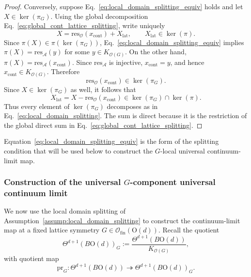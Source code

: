 \documentclass[aps,prx,reprint,superscriptaddress,twocolumn,amsmath,amssymb,amsfonts, nofootinbib]{revtex4-2}
\newcommand{\ofin}{\mathcal{O}_{\text{fin}}}
\newcommand{\res}{\text{res}}
\theoremstyle{apsstyle}
\begin{document}
\begin{proof}
Conversely, suppose Eq.~\ref{eq:local_domain_splitting_equiv} holds and let
$X\in\ker(\pi_G)$. Using the global decomposition
Eq.~\ref{eq:global_cont_lattice_splitting}, write uniquely
\begin{equation*}
    X=\res_{\mathcal O}(x_{\mathrm{cont}})+X_{\mathrm{lat}},
    \qquad
    X_{\mathrm{lat}}\in\ker(\pi).
\end{equation*}
Since $\pi(X)\in\pi(\ker(\pi_G))$, Eq.~\ref{eq:local_domain_splitting_equiv} implies $\pi(X)=\res_{\mathcal A}(y)$ for some $y\in K_{\mathcal O(G)}$. On the other hand, $\pi(X)=\res_{\mathcal A}(x_{\mathrm{cont}})$. Since $\res_{\mathcal A}$ is injective, $x_{\mathrm{cont}}=y$, and hence
$x_{\mathrm{cont}}\in K_{\mathcal O(G)}$. Therefore
\begin{equation*}
    \res_{\mathcal O}(x_{\mathrm{cont}})
    \in\ker(\pi_G).
\end{equation*}
Since $X\in\ker(\pi_G)$ as well, it follows that
\begin{equation*}
    X_{\mathrm{lat}}
    =
    X-\res_{\mathcal O}(x_{\mathrm{cont}})
    \in\ker(\pi_G)\cap\ker(\pi).
\end{equation*}
Thus every element of $\ker(\pi_G)$ decomposes as in
Eq.~\ref{eq:local_domain_splitting}. The sum is direct because it is the restriction of the global direct sum in
Eq.~\ref{eq:global_cont_lattice_splitting}.
\end{proof}

Equation~\ref{eq:local_domain_splitting_equiv} is the form of the splitting condition that will be used below to construct the $G$-local universal continuum-limit map.

\subsubsection{Construction of the universal $G$-component universal continuum limit}
\label{app:local_continuum_limit_construction}

We now use the local domain splitting of Assumption~\ref{assump:local_domain_splitting} to construct the continuum-limit map at a fixed lattice symmetry $G\in\ofin(\mathrm{O}(d))$. Recall the quotient
\begin{equation*}
    \Theta^{d+1}(B\mathrm{O}(d))_{G}
    :=
    \frac{\Theta^{d+1}(B\mathrm{O}(d))}
    {K_{\mathcal O(G)}},
\end{equation*}
with quotient map
\begin{equation*}
    \mathrm{pr}_{G}:
    \Theta^{d+1}(B\mathrm{O}(d))
    \twoheadrightarrow
    \Theta^{d+1}(B\mathrm{O}(d))_{G}.
\end{equation*}
\end{document}
